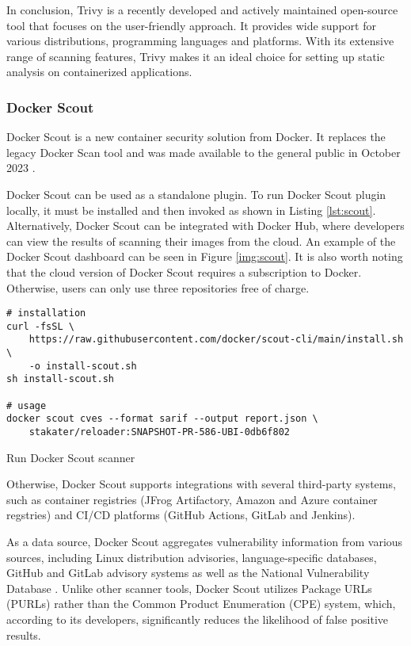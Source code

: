 In conclusion, Trivy is a recently developed and actively maintained open-source tool that focuses on the user-friendly approach. It provides wide support for various distributions, programming languages and platforms. With its extensive range of scanning features, Trivy makes it an ideal choice for setting up static analysis on containerized applications.


\subsubsection{Docker Scout}

Docker Scout is a new container security solution from Docker. It replaces the legacy Docker Scan tool and was made available to the general public in October 2023 \cite{s:scoutga}. 

Docker Scout can be used as a standalone plugin. To run Docker Scout plugin locally, it must be installed and then invoked as shown in Listing \ref{lst:scout}. Alternatively, Docker Scout can be integrated with Docker Hub, where developers can view the results of scanning their images from the cloud. An example of the Docker Scout dashboard can be seen in Figure \ref{img:scout}. It is also worth noting that the cloud version of Docker Scout requires a subscription to Docker. Otherwise, users can only use three repositories free of charge.


\begin{listing}[htp]
    \centering
    \begin{minipage}{1\linewidth}
        \begin{verbatim}
# installation
curl -fsSL \
    https://raw.githubusercontent.com/docker/scout-cli/main/install.sh \
    -o install-scout.sh
sh install-scout.sh

# usage
docker scout cves --format sarif --output report.json \
    stakater/reloader:SNAPSHOT-PR-586-UBI-0db6f802
        \end{verbatim}
    \end{minipage}
    \caption{Run Docker Scout scanner}
    \label{lst:scout}
\end{listing}

Otherwise, Docker Scout supports integrations with several third-party systems, such as container registries (JFrog Artifactory, Amazon and Azure container regstries) and CI/CD platforms (GitHub Actions, GitLab and Jenkins).

As a data source, Docker Scout aggregates vulnerability information from various sources, including Linux distribution advisories, language-specific databases, GitHub and GitLab advisory systems as well as the National Vulnerability Database \cite{d:scoutdb}. Unlike other scanner tools, Docker Scout utilizes Package URLs (PURLs) rather than the Common Product Enumeration (CPE) system, which, according to its developers, significantly reduces the likelihood of false positive results.

